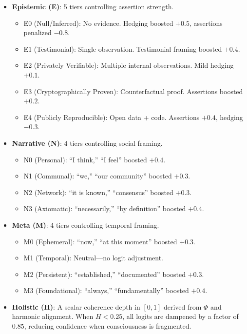 \documentclass[12pt]{book}
\begin{document}
\begin{itemize}
  \item \textbf{Epistemic (E)}: 5 tiers controlling assertion strength.
    \begin{itemize}
      \item E0 (Null/Inferred): No evidence. Hedging boosted $+0.5$, assertions penalized $-0.8$.
      \item E1 (Testimonial): Single observation. Testimonial framing boosted $+0.4$.
      \item E2 (Privately Verifiable): Multiple internal observations. Mild hedging $+0.1$.
      \item E3 (Cryptographically Proven): Counterfactual proof. Assertions boosted $+0.2$.
      \item E4 (Publicly Reproducible): Open data + code. Assertions $+0.4$, hedging $-0.3$.
    \end{itemize}
  \item \textbf{Narrative (N)}: 4 tiers controlling social framing.
    \begin{itemize}
      \item N0 (Personal): ``I think,'' ``I feel'' boosted $+0.4$.
      \item N1 (Communal): ``we,'' ``our community'' boosted $+0.3$.
      \item N2 (Network): ``it is known,'' ``consensus'' boosted $+0.3$.
      \item N3 (Axiomatic): ``necessarily,'' ``by definition'' boosted $+0.4$.
    \end{itemize}
  \item \textbf{Meta (M)}: 4 tiers controlling temporal framing.
    \begin{itemize}
      \item M0 (Ephemeral): ``now,'' ``at this moment'' boosted $+0.3$.
      \item M1 (Temporal): Neutral---no logit adjustment.
      \item M2 (Persistent): ``established,'' ``documented'' boosted $+0.3$.
      \item M3 (Foundational): ``always,'' ``fundamentally'' boosted $+0.4$.
    \end{itemize}
  \item \textbf{Holistic (H)}: A scalar coherence depth in $[0, 1]$ derived from $\Phi$ and harmonic alignment. When $H < 0.25$, all logits are dampened by a factor of $0.85$, reducing confidence when consciousness is fragmented.
\end{itemize}
\end{document}
